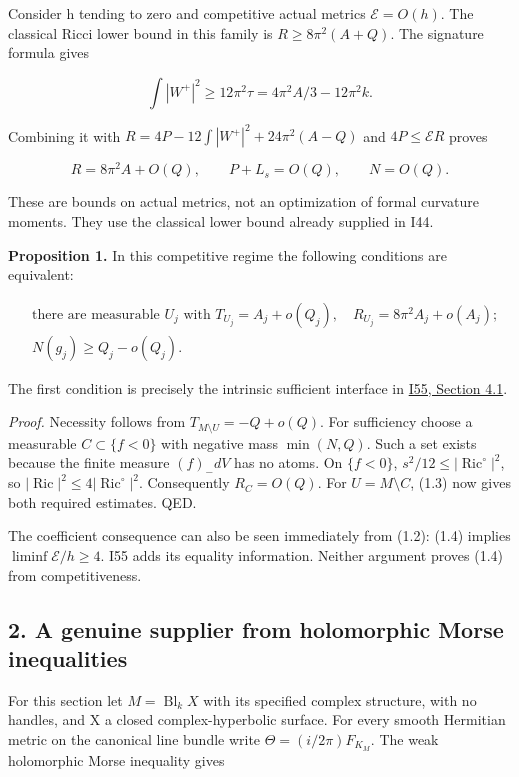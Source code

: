 \documentclass[
  10pt,
]{article}
\begin{document}
Consider h tending to zero and competitive actual metrics
\(\mathcal E=O(h)\). The classical Ricci lower bound in this family is
\(R\ge8\pi^2(A+Q)\). The signature formula gives

\[
 \int|W^+|^2\ge12\pi^2\tau
   =4\pi^2A/3-12\pi^2k.
\]

Combining it with \(R=4P-12\int|W^+|^2+24\pi^2(A-Q)\) and
\(4P\le\mathcal E R\) proves

\[
 R=8\pi^2A+O(Q),\qquad P+L_s=O(Q),\qquad N=O(Q).
 \tag{1.3}
\]

These are bounds on actual metrics, not an optimization of formal
curvature moments. They use the classical lower bound already supplied
in I44.

\textbf{Proposition 1.} In this competitive regime the following
conditions are equivalent:

\[
 \begin{aligned}
 &\text{there are measurable }U_j\text{ with }
 T_{U_j}=A_j+o(Q_j),\quad R_{U_j}=8\pi^2A_j+o(A_j);\\
 &N(g_j)\ge Q_j-o(Q_j).
 \end{aligned} \tag{1.4}
\]

The first condition is precisely the intrinsic sufficient interface in
\href{20260928_localization_and_coupled_filling.md}{I55, Section 4.1}.

\emph{Proof.} Necessity follows from \(T_{M\setminus U}=-Q+o(Q)\). For
sufficiency choose a measurable \(C\subset\{f<0\}\) with negative mass
\(\min(N,Q)\). Such a set exists because the finite measure \((f)_-dV\)
has no atoms. On \(\{f<0\}\),
\(s^2/12\le|\operatorname{Ric}^{\circ}|^2\), so
\(|\operatorname{Ric}|^2\le4|\operatorname{Ric}^{\circ}|^2\).
Consequently \(R_C=O(Q)\). For \(U=M\setminus C\), (1.3) now gives both
required estimates. QED.

The coefficient consequence can also be seen immediately from (1.2):
(1.4) implies \(\liminf\mathcal E/h\ge4\). I55 adds its equality
information. Neither argument proves (1.4) from competitiveness.

\hypertarget{a-genuine-supplier-from-holomorphic-morse-inequalities}{%
\subsection{2. A genuine supplier from holomorphic Morse
inequalities}\label{a-genuine-supplier-from-holomorphic-morse-inequalities}}

For this section let \(M=\operatorname{Bl}_k X\) with its specified
complex structure, with no handles, and X a closed complex-hyperbolic
surface. For every smooth Hermitian metric on the canonical line bundle
write \(\Theta=(i/2\pi)F_{K_M}\). The weak holomorphic Morse inequality
gives
\end{document}
